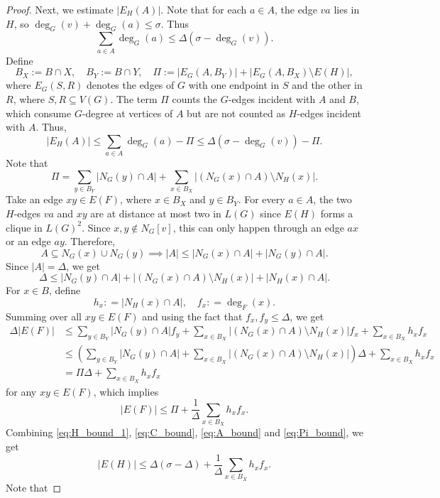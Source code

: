 \documentclass[11pt]{article}
\theoremstyle{plain}
\numberwithin{equation}{section}
\begin{document}
\begin{proof}
Next, we estimate $|E_H(A)|$. Note that for each $a\in A$, the edge $va$ lies in $H$, so $\deg_G(v)+\deg_G(a)\le \sigma.$
Thus
\[
   \sum_{a\in A}\deg_G(a)\le \Delta(\sigma-\deg_G(v)).
\]
Define 
\[
  B_X:=B\cap X,\quad B_Y:=B\cap Y, \quad   \Pi:= |E_G(A,B_Y)| + |E_G(A,B_X)\setminus E(H)|,
\]
where $E_G(S,R)$ denotes the edges of $G$ with one endpoint in $S$ and the other in $R$, where $S, R\subseteq V(G)$. The term $\Pi$ counts the $G$-edges incident with $A$ and $B$, which consume $G$-degree at vertices of $A$ but are not counted as $H$-edges incident with $A$. Thus, 
\begin{equation}\label{eq:A_bound}
    |E_H(A)| \le \sum_{a\in A}\deg_G(a)-\Pi \le \Delta(\sigma-\deg_G(v))-\Pi.
\end{equation}
Note that 
\[
   \Pi= \sum_{y\in B_Y} |N_G(y)\cap A| + \sum_{x\in B_X} |(N_G(x)\cap A)\setminus N_H(x)|.
\]
Take an edge $xy\in E(F)$, where $x\in B_X$ and $y\in B_Y$. For every
$a\in A$, the two $H$-edges $va$ and $xy$ are at distance at most
two in $L(G)$ since $E(H)$ forms a clique in $L(G)^2$. Since $x,y\notin N_G[v]$, this can only happen through
an edge $ax$ or an edge $ay$. Therefore,
\[
   A\subseteq N_G(x)\cup N_G(y) \implies   |A|\le |N_G(x)\cap A| + |N_G(y)\cap A|.
\]
Since $|A| = \Delta$, we get 
\[ \Delta \le  |N_G(y)\cap A|  + |(N_G(x)\cap A)\setminus N_H(x)| + |N_H(x)\cap A|. \]
For $x\in B$, define 
\[ h_x : = |N_H(x)\cap A|, \quad f_x: = \deg_{F}(x).\]
Summing over all $xy\in E(F)$ and using the fact that $f_x, f_y\le \Delta$, we get
\begin{align*}
    \Delta |E(F)|
    & \le  \sum_{y\in B_Y}|N_G(y)\cap A|f_y  + \sum_{x\in B_X}|(N_G(x)\cap A)\setminus N_H(x)|f_x + \sum_{x\in B_X}h_xf_x\\
   & \le  \left(\sum_{y\in B_Y}|N_G(y)\cap A|  + \sum_{x\in B_X}|(N_G(x)\cap A)\setminus N_H(x)|\right)\Delta + \sum_{x\in B_X}h_xf_x\\
   &  = \Pi \Delta +  \sum_{x\in B_X}h_xf_x
\end{align*}
for any $xy\in E(F)$, which implies
\begin{equation}\label{eq:Pi_bound}
   |E(F)|\le \Pi+\frac{1}{\Delta}\sum_{x\in B_X}h_xf_x. 
\end{equation}
Combining \eqref{eq:H_bound_1}, \eqref{eq:C_bound}, \eqref{eq:A_bound} and \eqref{eq:Pi_bound}, we get 
\begin{equation}\label{eq:H_bound_2}
   |E(H)| \le \Delta(\sigma-\Delta) + \frac{1}{\Delta}\sum_{x\in B_X}h_xf_x. 
\end{equation}
Note that 

\end{proof}
\end{document}

